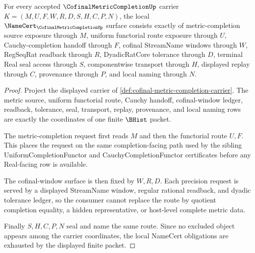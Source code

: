 \begin{theorem}
\label{thm:cofinal-metric-completion-namecert-obligations}
For every accepted $\CofinalMetricCompletionUp$ carrier $K=(M,U,F,W,R,D,S,H,C,P,N)$, the local $\NameCert_{\CofinalMetricCompletionUp}$ surface consists exactly of metric-completion source exposure through $M$, uniform functorial route exposure through $U$, Cauchy-completion handoff through $F$, cofinal StreamName windows through $W$, RegSeqRat readback through $R$, DyadicRatCore tolerance through $D$, terminal Real seal access through $S$, componentwise transport through $H$, displayed replay through $C$, provenance through $P$, and local naming through $N$.
\end{theorem}
\begin{proof}
Project the displayed carrier of \autoref{def:cofinal-metric-completion-carrier}. The metric source, uniform functorial route, Cauchy handoff, cofinal-window ledger, readback, tolerance, seal, transport, replay, provenance, and local naming rows are exactly the coordinates of one finite $\BHist$ packet.

The metric-completion request first reads $M$ and then the functorial route $U,F$. This places the request on the same completion-facing path used by the sibling UniformCompletionFunctor and CauchyCompletionFunctor certificates before any Real-facing row is available.

The cofinal-window surface is then fixed by $W,R,D$. Each precision request is served by a displayed StreamName window, regular rational readback, and dyadic tolerance ledger, so the consumer cannot replace the route by quotient completion equality, a hidden representative, or host-level complete metric data.

Finally $S,H,C,P,N$ seal and name the same route. Since no excluded object appears among the carrier coordinates, the local NameCert obligations are exhausted by the displayed finite packet.
\end{proof}

